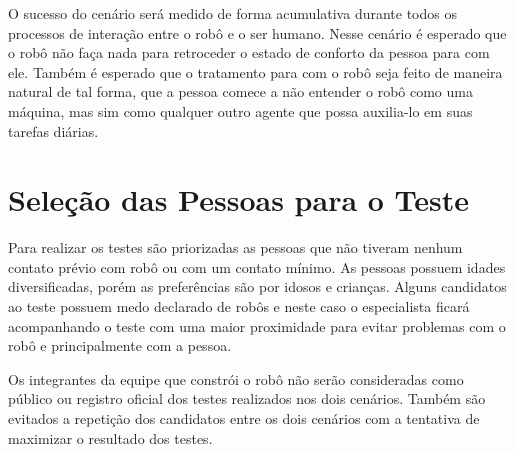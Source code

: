 O sucesso do cenário será medido de forma acumulativa durante todos os processos de interação entre o robô e o ser humano. Nesse cenário é esperado que o robô não faça nada para retroceder o estado de conforto da pessoa para com ele. Também é esperado que o tratamento para com o robô seja feito de maneira natural de tal forma, que a pessoa comece a não entender o robô como uma máquina, mas sim como qualquer outro agente que possa auxilia-lo em suas tarefas diárias.

\section{Seleção das Pessoas para o Teste}
\label{sec:perfistestes}
Para realizar os testes são priorizadas as pessoas que não tiveram nenhum contato prévio com robô ou com um contato mínimo. As pessoas possuem idades diversificadas, porém as preferências são por idosos e crianças. Alguns candidatos ao teste possuem medo declarado de robôs e neste caso o especialista ficará acompanhando o teste com uma maior proximidade para evitar problemas com o robô e principalmente com a pessoa.

Os integrantes da equipe que constrói o robô não serão consideradas como público ou registro oficial dos testes realizados nos dois cenários. Também são evitados a repetição dos candidatos entre os dois cenários com a tentativa de maximizar o resultado dos testes.
